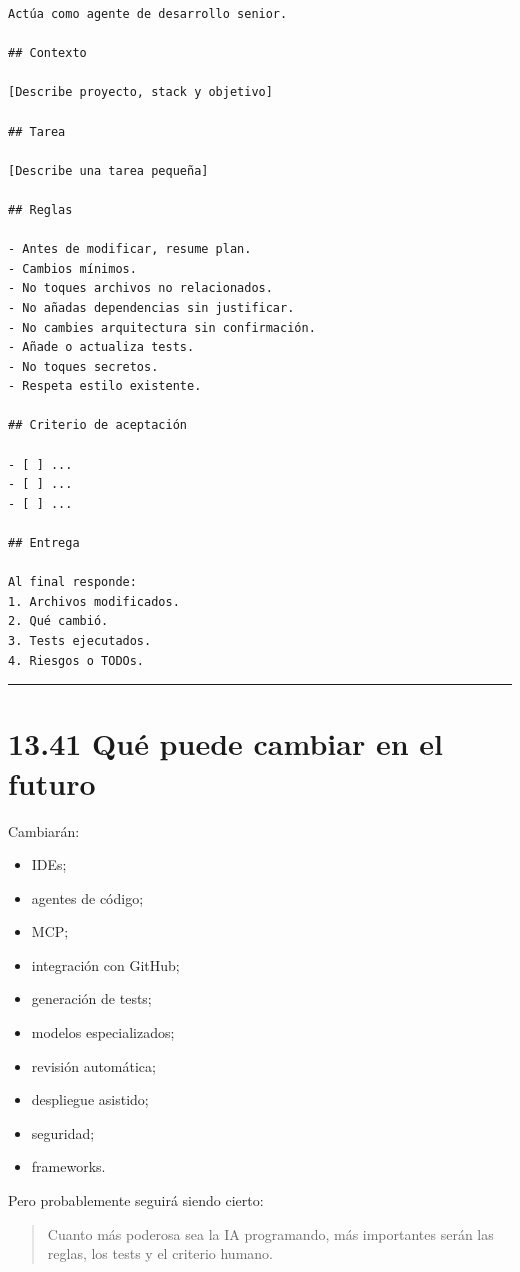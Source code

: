 \begin{lstlisting}
Actúa como agente de desarrollo senior.

## Contexto

[Describe proyecto, stack y objetivo]

## Tarea

[Describe una tarea pequeña]

## Reglas

- Antes de modificar, resume plan.
- Cambios mínimos.
- No toques archivos no relacionados.
- No añadas dependencias sin justificar.
- No cambies arquitectura sin confirmación.
- Añade o actualiza tests.
- No toques secretos.
- Respeta estilo existente.

## Criterio de aceptación

- [ ] ...
- [ ] ...
- [ ] ...

## Entrega

Al final responde:
1. Archivos modificados.
2. Qué cambió.
3. Tests ejecutados.
4. Riesgos o TODOs.
\end{lstlisting}

\begin{center}\rule{0.5\linewidth}{0.5pt}\end{center}

\section{13.41 Qué puede cambiar en el
futuro}\label{quuxe9-puede-cambiar-en-el-futuro-12}

Cambiarán:

\begin{itemize}
\tightlist
\item
  IDEs;
\item
  agentes de código;
\item
  MCP;
\item
  integración con GitHub;
\item
  generación de tests;
\item
  modelos especializados;
\item
  revisión automática;
\item
  despliegue asistido;
\item
  seguridad;
\item
  frameworks.
\end{itemize}

Pero probablemente seguirá siendo cierto:

\begin{quote}
Cuanto más poderosa sea la IA programando, más importantes serán las
reglas, los tests y el criterio humano.
\end{quote}

